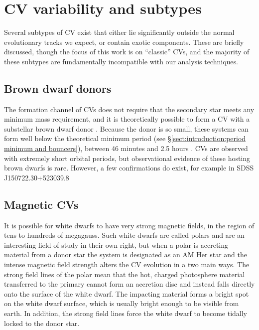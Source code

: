\section{CV variability and subtypes}
Several subtypes of CV exist that either lie significantly outside the normal evolutionary tracks we expect, or contain exotic components. These are briefly discussed, though the focus of this work is on ``classic'' CVs, and the majority of these subtypes are fundamentally incompatible with our analysis techniques.

\subsection{Brown dwarf donors}
\label{sect:introduction:brown dwarf donors}

The formation channel of CVs does not require that the secondary star meets any minimum mass requirement, and it is theoretically possible to form a CV with a substellar brown dwarf donor \citep{politano2002,politano2004}. Because the donor is so small, these systems can form well below the theoretical minimum period (see \S\ref{sect:introduction:period minimum and bouncers}), between 46 minutes and 2.5 hours \citep{politano2004}. CVs are observed with extremely short orbital periods, but observational evidence of these hosting brown dwarfs is rare. However, a few confirmations do exist, for example in SDSS J150722.30+523039.8 \citep{littlefair2007}

\subsection{Magnetic CVs}
\label{sect:introduction:magnetic CVs}

It is possible for white dwarfs to have very strong magnetic fields, in the region of tens to hundreds of megagauss. Such white dwarfs are called polars and are an interesting field of study in their own right, but when a polar is accreting material from a donor star the system is designated as an AM Her star and the intense magnetic field strength alters the CV evolution in a two main ways. The strong field lines of the polar mean that the hot, charged photosphere material transferred to the primary cannot form an accretion disc and instead falls directly onto the surface of the white dwarf. The impacting material forms a bright spot on the white dwarf surface, which is usually bright enough to be visible from earth. In addition, the strong field lines force the white dwarf to become tidally locked to the donor star. 

